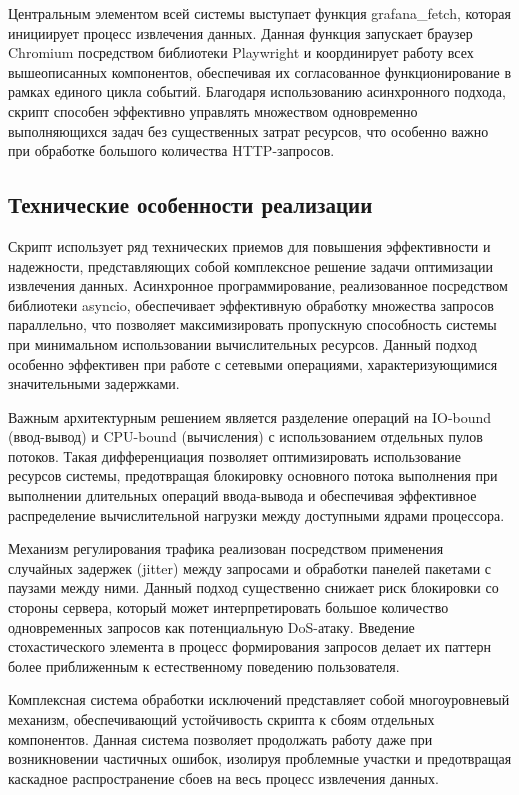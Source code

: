 Центральным элементом всей системы выступает функция grafana\_fetch, которая
инициирует процесс извлечения данных. Данная функция запускает браузер Chromium
посредством библиотеки Playwright и координирует работу всех вышеописанных
компонентов, обеспечивая их согласованное функционирование в рамках единого
цикла событий. Благодаря использованию асинхронного подхода, скрипт способен
эффективно управлять множеством одновременно выполняющихся задач без
существенных затрат ресурсов, что особенно важно при обработке большого
количества HTTP-запросов.

\subsection{Технические особенности реализации}

Скрипт использует ряд технических приемов для повышения эффективности и
надежности, представляющих собой комплексное решение задачи оптимизации
извлечения данных. Асинхронное программирование, реализованное посредством
библиотеки asyncio, обеспечивает эффективную обработку множества запросов
параллельно, что позволяет максимизировать пропускную способность системы при
минимальном использовании вычислительных ресурсов. Данный подход особенно
эффективен при работе с сетевыми операциями, характеризующимися значительными
задержками.

Важным архитектурным решением является разделение операций на IO-bound
(ввод-вывод) и CPU-bound (вычисления) с использованием отдельных пулов потоков.
Такая дифференциация позволяет оптимизировать использование ресурсов системы,
предотвращая блокировку основного потока выполнения при выполнении длительных
операций ввода-вывода и обеспечивая эффективное распределение вычислительной
нагрузки между доступными ядрами процессора.

Механизм регулирования трафика реализован посредством применения случайных
задержек (jitter) между запросами и обработки панелей пакетами с паузами между
ними. Данный подход существенно снижает риск блокировки со стороны сервера,
который может интерпретировать большое количество одновременных запросов как
потенциальную DoS-атаку. Введение стохастического элемента в процесс
формирования запросов делает их паттерн более приближенным к естественному
поведению пользователя.

Комплексная система обработки исключений представляет собой многоуровневый
механизм, обеспечивающий устойчивость скрипта к сбоям отдельных компонентов.
Данная система позволяет продолжать работу даже при возникновении частичных
ошибок, изолируя проблемные участки и предотвращая каскадное распространение
сбоев на весь процесс извлечения данных.

